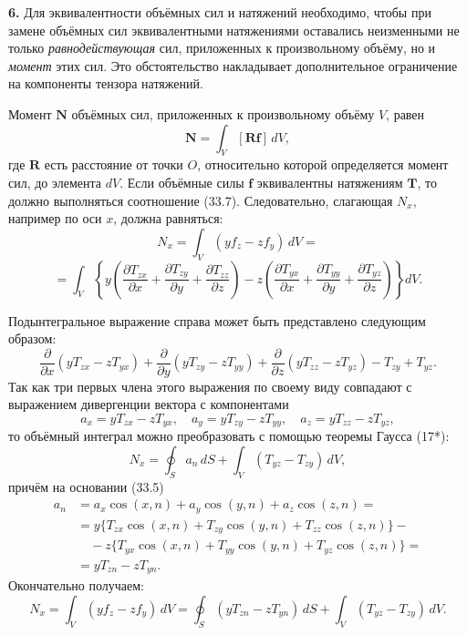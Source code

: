 \documentclass[a4paper,10pt]{article}
\begin{document}
\textbf{6.} Для эквивалентности объёмных сил и натяжений необходимо,
чтобы при замене объёмных сил эквивалентными натяжениями оставались
неизменными не только \textit{равнодействующая} сил, приложенных к
произвольному объёму, но и \textit{момент} этих сил. Это обстоятельство
накладывает дополнительное ограничение на компоненты тензора натяжений.

Момент $\mathbf{N}$ объёмных сил, приложенных к произвольному объёму
$V$, равен
\begin{equation}
    \mathbf{N} = \int_V [\mathbf{R}\mathbf{f}]\,dV,
    \tag{33.8}
\end{equation}
где $\mathbf{R}$ есть расстояние от точки $O$, относительно которой
определяется момент сил, до элемента $dV$. Если объёмные силы
$\mathbf{f}$ эквивалентны натяжениям $\mathbf{T}$, то должно
выполняться соотношение (33.7). Следовательно, слагающая $N_x$,
например по оси $x$, должна равняться:
$$
    N_x = \int_V (yf_z - zf_y)\,dV =
$$
$$
    = \int_V\!\left\{
        y\!\left(
            \frac{\partial T_{zx}}{\partial x}
          + \frac{\partial T_{zy}}{\partial y}
          + \frac{\partial T_{zz}}{\partial z}
        \right)
        - z\!\left(
            \frac{\partial T_{yx}}{\partial x}
          + \frac{\partial T_{yy}}{\partial y}
          + \frac{\partial T_{yz}}{\partial z}
        \right)
    \right\}dV.
$$


Подынтегральное выражение справа может быть представлено следующим
образом:
$$
    \frac{\partial}{\partial x}(yT_{zx} - zT_{yx})
  + \frac{\partial}{\partial y}(yT_{zy} - zT_{yy})
  + \frac{\partial}{\partial z}(yT_{zz} - zT_{yz})
  - T_{zy} + T_{yz}.
$$
Так как три первых члена этого выражения по своему виду совпадают
с выражением дивергенции вектора с компонентами
$$
    a_x = yT_{zx} - zT_{yx},\quad
    a_y = yT_{zy} - zT_{yy},\quad
    a_z = yT_{zz} - zT_{yz},
$$
то объёмный интеграл можно преобразовать с помощью теоремы Гаусса (17*):
$$
    N_x = \oint_S a_n\,dS + \int_V (T_{yz} - T_{zy})\,dV,
$$
причём на основании (33.5)
\begin{align*}
    a_n &= a_x\cos(x,n) + a_y\cos(y,n) + a_z\cos(z,n) = \\
        &= y\{T_{zx}\cos(x,n) + T_{zy}\cos(y,n) + T_{zz}\cos(z,n)\} - \\
        &\quad - z\{T_{yx}\cos(x,n) + T_{yy}\cos(y,n) + T_{yz}\cos(z,n)\} = \\
        &= yT_{zn} - zT_{yn}.
\end{align*}
Окончательно получаем:
\begin{equation}
    N_x = \int_V (yf_z - zf_y)\,dV
        = \oint_S (yT_{zn} - zT_{yn})\,dS
        + \int_V (T_{yz} - T_{zy})\,dV.
    \tag{33.9}
\end{equation}
\end{document}
